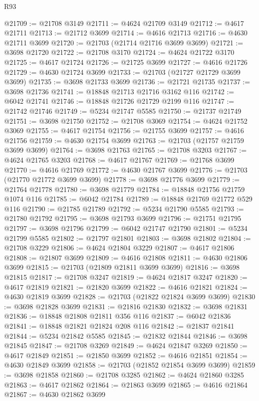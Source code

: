 \begin{lexlean}{R93}
\begin{coremodule}
@21709 := @21708 @3149
@21711 := @4624 @21709 @3149
@21712 := @4617 @21711
@21713 := @21712 @3699
@21714 := @4616 @21713
@21716 := @4630 @21711 @3699
@21720 := @21703 (@21714 @21716 @3699 @3699)
@21721 := @3698 @21720
@21722 := @21708 @3170
@21724 := @4624 @21722 @3170
@21725 := @4617 @21724
@21726 := @21725 @3699
@21727 := @4616 @21726
@21729 := @4630 @21724 @3699
@21733 := @21703 (@21727 @21729 @3699 @3699)
@21735 := @3698 @21733 @3699
@21736 := @21721 @21735
@21737 := @3698 @21736
@21741 := @18848 @21713 @21716 @3162 @116
@21742 := @6042 @21741
@21746 := @18848 @21726 @21729 @2199 @116
@21747 := @21742 @21746
@21749 := @5234 @21747 @5585
@21750 := @21737 @21749
@21751 := @3698 @21750
@21752 := @21708 @3069
@21754 := @4624 @21752 @3069
@21755 := @4617 @21754
@21756 := @21755 @3699
@21757 := @4616 @21756
@21759 := @4630 @21754 @3699
@21763 := @21703 (@21757 @21759 @3699 @3699)
@21764 := @3698 @21763
@21765 := @21708 @3203
@21767 := @4624 @21765 @3203
@21768 := @4617 @21767
@21769 := @21768 @3699
@21770 := @4616 @21769
@21772 := @4630 @21767 @3699
@21776 := @21703 (@21770 @21772 @3699 @3699)
@21778 := @3698 @21776 @3699
@21779 := @21764 @21778
@21780 := @3698 @21779
@21784 := @18848 @21756 @21759 @1074 @116
@21785 := @6042 @21784
@21789 := @18848 @21769 @21772 @529 @116
@21790 := @21785 @21789
@21792 := @5234 @21790 @5585
@21793 := @21780 @21792
@21795 := @3698 @21793 @3699
@21796 := @21751 @21795
@21797 := @3698 @21796
@21799 := @6042 @21747 @21790
@21801 := @5234 @21799 @5585
@21802 := @21797 @21801
@21803 := @3698 @21802
@21804 := @21708 @3229
@21806 := @4624 @21804 @3229
@21807 := @4617 @21806
@21808 := @21807 @3699
@21809 := @4616 @21808
@21811 := @4630 @21806 @3699
@21815 := @21703 (@21809 @21811 @3699 @3699)
@21816 := @3698 @21815
@21817 := @21708 @3247
@21819 := @4624 @21817 @3247
@21820 := @4617 @21819
@21821 := @21820 @3699
@21822 := @4616 @21821
@21824 := @4630 @21819 @3699
@21828 := @21703 (@21822 @21824 @3699 @3699)
@21830 := @3698 @21828 @3699
@21831 := @21816 @21830
@21832 := @3698 @21831
@21836 := @18848 @21808 @21811 @356 @116
@21837 := @6042 @21836
@21841 := @18848 @21821 @21824 @208 @116
@21842 := @21837 @21841
@21844 := @5234 @21842 @5585
@21845 := @21832 @21844
@21846 := @3698 @21845
@21847 := @21708 @3269
@21849 := @4624 @21847 @3269
@21850 := @4617 @21849
@21851 := @21850 @3699
@21852 := @4616 @21851
@21854 := @4630 @21849 @3699
@21858 := @21703 (@21852 @21854 @3699 @3699)
@21859 := @3698 @21858
@21860 := @21708 @3285
@21862 := @4624 @21860 @3285
@21863 := @4617 @21862
@21864 := @21863 @3699
@21865 := @4616 @21864
@21867 := @4630 @21862 @3699

\end{coremodule}
\end{lexlean}
